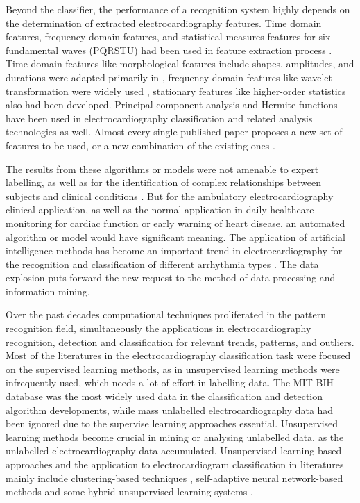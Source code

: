 \documentclass[journal]{IEEEtran}
\begin{document}
 
Beyond the classifier, the performance of a recognition system highly depends on the determination of extracted electrocardiography features. Time domain features, frequency domain features, and statistical measures features for six fundamental waves (PQRSTU) had been used in feature extraction process \cite{chia}. 
Time domain features like morphological features include shapes, amplitudes, and durations were adapted primarily in \cite{jekova, christove, can}, frequency domain features like wavelet transformation were widely used \cite{inan}, \cite{banerjee} stationary features like higher-order statistics also had been developed. 
Principal component analysis \cite{stam} and Hermite functions \cite{lager} have been used in electrocardiography classification and related analysis technologies as well.
Almost every single published paper proposes a new set of features to be used, or a new combination of the existing ones \cite{mar}.


The results from these algorithms or models were not amenable to expert labelling, as well as for the identification of complex relationships between subjects and clinical conditions \cite{clifford}.
But for the ambulatory electrocardiography clinical application, as well as the normal application in daily healthcare monitoring for cardiac function or early warning of heart disease, an automated algorithm or model would have significant meaning.
The application of artificial intelligence methods has become an important trend in electrocardiography for the recognition and classification of different arrhythmia types \cite{clifford}. 
The data explosion puts forward the new request to the method of data processing and information mining.


Over the past decades computational techniques proliferated in the pattern recognition field, simultaneously the applications in electrocardiography recognition, detection and classification for relevant trends, patterns, and outliers. 
Most of the literatures in the electrocardiography classification task were focused on the supervised learning methods, as in unsupervised learning methods were infrequently used, which needs a lot of effort in labelling data. The MIT-BIH database \cite{physionet} was the most widely used data in the classification and detection algorithm developments, while mass unlabelled electrocardiography data had been ignored due to the supervise learning approaches essential. 
Unsupervised learning methods become crucial in mining or analysing unlabelled data, as the unlabelled electrocardiography data accumulated. Unsupervised learning-based approaches and the application to electrocardiogram classification in literatures mainly include clustering-based techniques \cite{lager, nishizawa, maier}, self-adaptive neural network-based methods \cite{palreddy, risk} and some hybrid unsupervised learning systems \cite{tadejko}. 
\end{document}
